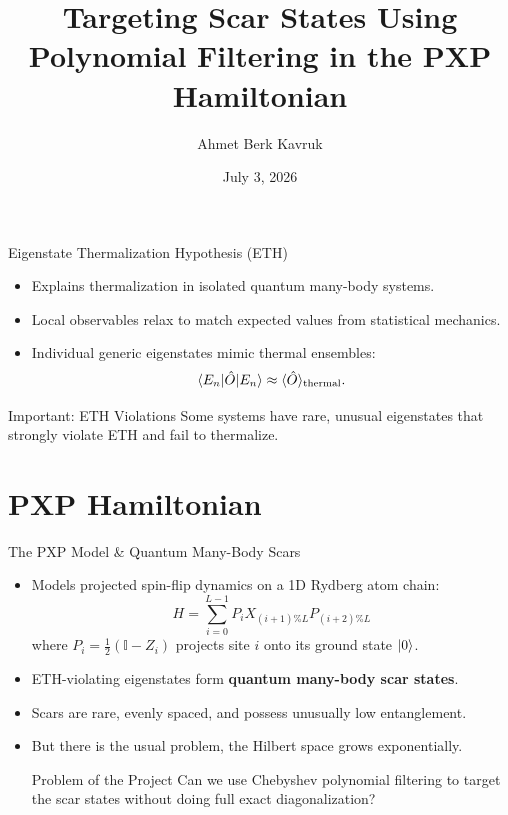 \documentclass[aspectratio=169]{beamer}
\title[PXP Polynomial Filtering]
{Targeting Scar States Using Polynomial Filtering in the PXP Hamiltonian}
\author{Ahmet Berk Kavruk}
\date{July 3, 2026}
\begin{document}
\begin{frame}
    \titlepage
\end{frame}

\begin{frame}{Eigenstate Thermalization Hypothesis (ETH)}
    \begin{itemize}
        \item Explains thermalization in isolated quantum many-body systems.
        \item Local observables relax to match expected values from statistical mechanics.
        \item Individual generic eigenstates mimic thermal ensembles:
        \begin{equation}
            \braket{E_n|\hat{O}|E_n}\approx \langle \hat{O}\rangle_{\mathrm{thermal}}.
        \end{equation}
    \end{itemize}
    \vfill
    \begin{block}{Important: ETH Violations}
        Some systems have rare, unusual eigenstates that strongly violate ETH and fail to thermalize.
    \end{block}
\end{frame}

\section{PXP Hamiltonian}

\begin{frame}{The PXP Model \& Quantum Many-Body Scars}
    \begin{itemize}
        \item Models projected spin-flip dynamics on a 1D Rydberg atom chain:
        \begin{equation}
            H = \sum_{i=0}^{L-1} P_{i} X_{(i+1)\%L} P_{(i+2)\%L}
        \end{equation}
        where $P_i = \frac{1}{2}(\mathbb{I} - Z_i)$ projects site $i$ onto its ground state $\ket{0}$.
        \item ETH-violating eigenstates form \textbf{quantum many-body scar states}.
        \item Scars are rare, evenly spaced, and possess unusually low entanglement.
        \item But there is the usual problem, the Hilbert space grows exponentially.

        \begin{block}{Problem of the Project}
            Can we use Chebyshev polynomial filtering to target the scar states without doing full exact diagonalization?
        \end{block}
    \end{itemize}
\end{frame}
\end{document}
